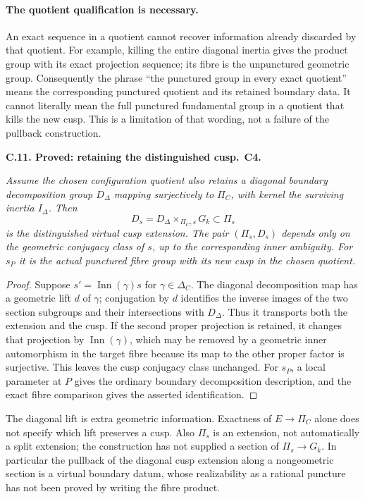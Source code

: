 \documentclass[11pt,a4paper]{article}
\newcommand{\Inn}{\operatorname{Inn}}
\newenvironment{claim}[3]{\par\medskip\noindent\hypertarget{#1}{\textbf{#1. #2.}}\ \textbf{#3.}\par\nopagebreak\smallskip\begingroup\itshape}{\endgroup\par\smallskip}
\begin{document}
\paragraph{The quotient qualification is necessary.}
An exact sequence in a quotient cannot recover information already
discarded by that quotient. For example, killing the entire diagonal
inertia gives the product group with its exact projection sequence;
its fibre is the unpunctured geometric group. Consequently the phrase
``the punctured group in every exact quotient'' means the corresponding
punctured quotient and its retained boundary data. It cannot literally
mean the full punctured fundamental group in a quotient that kills
the new cusp. This is a limitation of that wording, not a failure of
the pullback construction.

\begin{claim}{C.11}{Proved: retaining the distinguished cusp}{C4}
Assume the chosen configuration quotient also retains a diagonal
boundary decomposition group $D_\Delta$ mapping surjectively to
$\Pi_C$, with kernel the surviving inertia $I_\Delta$. Then
\[
 D_s=D_\Delta\times_{\Pi_C,s}G_k\subset\Pi_s
\]
is the distinguished virtual cusp extension. The pair $(\Pi_s,D_s)$
depends only on the geometric conjugacy class of $s$, up to the
corresponding inner ambiguity. For $s_P$ it is the actual punctured
fibre group with its new cusp in the chosen quotient.
\end{claim}
\begin{proof}
Suppose $s'=\Inn(\gamma)s$ for $\gamma\in\Delta_C$. The diagonal
decomposition map has a geometric lift $d$ of $\gamma$; conjugation
by $d$ identifies the inverse images of the two section subgroups and
their intersections with $D_\Delta$. Thus it transports both the
extension and the cusp. If the second proper projection is retained,
it changes that projection by $\Inn(\gamma)$, which may be removed
by a geometric inner automorphism in the target fibre because its
map to the other proper factor is surjective. This leaves the cusp
conjugacy class unchanged. For $s_P$, a local parameter at $P$ gives
the ordinary boundary decomposition description, and the exact fibre
comparison gives the asserted identification.
\end{proof}

The diagonal lift is extra geometric information. Exactness of
$E\to\Pi_C$ alone does not specify which lift preserves a cusp.
Also $\Pi_s$ is an extension, not automatically a split extension;
the construction has not supplied a section of $\Pi_s\to G_k$.
In particular the pullback of the diagonal cusp extension along a
nongeometric section is a virtual boundary datum, whose realizability
as a rational puncture has not been proved by writing the fibre product.
\end{document}
